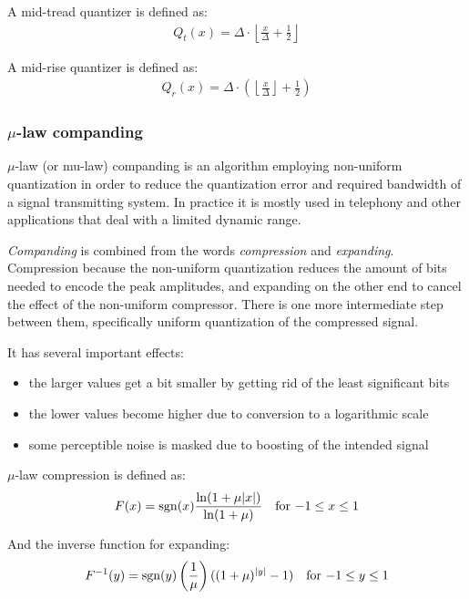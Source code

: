 A mid-tread quantizer is defined as:
\begin{align}
\label{equ:midtread_quant}
Q_t(x) = \Delta \cdot \left\lfloor \frac{x}{\Delta} + \frac12 \right\rfloor
\end{align}

A mid-rise quantizer is defined as:
\begin{align}
Q_r(x) = \Delta \cdot \left( \left\lfloor \frac{x}{\Delta} \right\rfloor + \frac12 \right)
\end{align}

\subsubsection{$\mu$-law companding}
\label{sec:mulaw}
$\mu$-law (or mu-law) companding is an algorithm employing non-uniform quantization in order to reduce the quantization error and required bandwidth of a signal transmitting system. In practice it is mostly used in telephony and other applications that deal with a limited dynamic range.

\emph{Companding} is combined from the words \emph{compression} and \emph{expanding}. Compression because the non-uniform quantization reduces the amount of bits needed to encode the peak amplitudes, and expanding on the other end to cancel the effect of the non-uniform compressor. There is one more intermediate step between them, specifically uniform quantization of the compressed signal. \cite{brokish_lewis_1997}

It has several important effects:
\begin{itemize}
	\item the larger values get a bit smaller by getting rid of the least significant bits
	\item the lower values become higher due to conversion to a logarithmic scale
	\item some perceptible noise is masked due to boosting of the intended signal
\end{itemize}

$\mu$-law compression is defined as: \cite{cisco_2017}
\begin{align}
\label{equ:mu_law_compress}
F(x) &= \operatorname{sgn}(x) \frac{\ln(1+\mu|x|)}{\ln(1+\mu)} & \text{for $-1 \le x \le 1$}
\end{align}

And the inverse function for expanding:
\begin{align}
F^{-1}(y) &= \operatorname{sgn}(y)\left(\frac{1}{\mu}\right)((1+\mu)^{|y|}-1) & \text{for $-1 \le y \le 1$}
\end{align}

